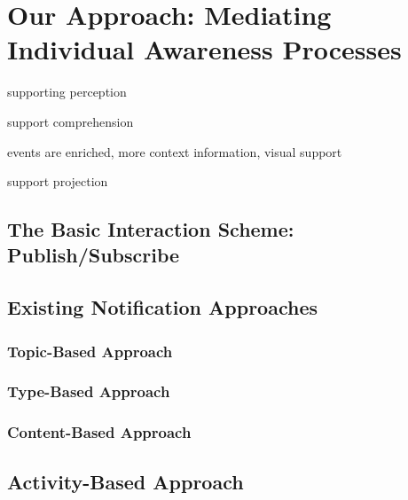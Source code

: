 \graphicspath{{Figures/}}

\chapter{Our Approach: Mediating Individual Awareness Processes} %
\label{cha:mediate_individual_awareness_processes}

supporting perception

support comprehension

events are enriched, more context information, visual support

support projection

\section{The Basic Interaction Scheme: Publish/Subscribe} %
\label{sec:the_basic_interaction_scheme_publish_subscribe}


\section{Existing Notification Approaches} %
\label{sec:existing_notification_approaches}
\subsection{Topic-Based Approach} %
\label{sub:topic_based_approach}


\subsection{Type-Based Approach} %
\label{sub:type_based_approach}


\subsection{Content-Based Approach} %
\label{sub:content_based_approach}



\section{Activity-Based Approach} %
\label{sec:activity_based_approach}
